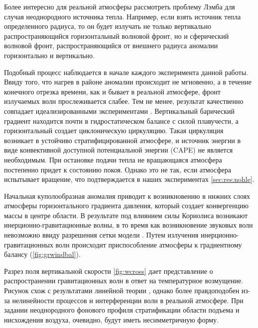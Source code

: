 \documentclass[12pt,a4paper]{report}
\begin{document}
Более интересно для реальной атмосферы рассмотреть проблему Лэмба для случая неоднородного источника тепла. Например, если взять источник тепла определенного радиуса, то он будет излучать не только вертикально распространяющийся горизонтальный волновой фронт, но и сферический волновой фронт, распространяющийся от внешнего радиуса аномалии горизонтально и вертикально. 

Подобный процесс наблюдается в начале каждого эксперимента данной работы. Ввиду того, что нагрев в районе аномалии происходит не мгновенно, а в течение конечного отрезка времени, как и бывает в реальной атмосфере,  фронт излучаемых волн прослеживается слабее. Тем не менее, результат качественно совпадает идеализированными экспериментами \citep{RT2003}. Вертикальный барический градиент находится почти в гидростатическом балансе с силой плавучести, а горизонтальный создает циклоническую циркуляцию. Такая циркуляция возникает в устойчиво стратифицированной атмосфере, и источник энергии в виде конвективной доступной потенциальной энергии (CAPE) не является необходимым. При остановке подачи тепла не вращающаяся атмосфера постепенно придет к состоянию покоя. Однако это не так, если атмосфера испытывает вращение, что подтверждается в наших экспериментах \ref{sec:res:nohle}.

\begin{wrapfigure}{l}{0.5\textwidth}
\begin{center}
\texttt{[image: \{./chapters/figures\_results/slpmin\_vortmax.00h-43h.ctrl]}.png}
\end{center}
\caption{Изменение аномалии приземного давления и максимальной завихренности во времени. Эксперимент CTRL.}
\label{fig:ctrl_slpminvortmax}
\end{wrapfigure}

Начальная куполообразная аномалия приводит к возникновению в нижних слоях атмосферы горизонтального градиента давления, который создает конвергенцию массы в центре области. В результате под влиянием силы Кориолиса возникают инерционно-гравитационные волны, в то время как возникновение звуковых волн невозможно ввиду разрешения сетки модели \citep{MillerWhite1984,MirandaPhD}. Путем излучения инерционно-гравитационных волн происходит приспособление атмосферы к градиентному балансу (\ref{fig:grwindbal}).

Разрез поля вертикальной скорости \ref{fig:wcross} дает представление о распространении гравитационных волн в ответ на температурное возмущение. Рисунок схож с результатами линейной теории \citep{Lin2007}, однако более правдоподобен из-за нелинейности процессов и интерференции волн в реальной атмосфере. При задании неоднородного фонового профиля стратификации области подъема и нисхождения воздуха, очевидно, будут иметь несимметричную форму.
\end{document}
